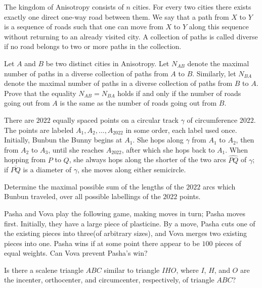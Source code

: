 \documentclass[11pt]{scrartcl}
\begin{document}
\begin{problem}[9103148252094553273]
	The kingdom of Anisotropy consists of $n$ cities. For every two cities there exists exactly one direct one-way road between them. We say that a path from $X$ to $Y$ is a sequence of roads such that one can move from $X$ to $Y$ along this sequence without returning to an already visited city. A collection of paths is called diverse if no road belongs to two or more paths in the collection.

Let $A$ and $B$ be two distinct cities in Anisotropy. Let $N_{AB}$ denote the maximal number of paths in a diverse collection of paths from $A$ to $B$. Similarly, let $N_{BA}$ denote the maximal number of paths in a diverse collection of paths from $B$ to $A$. Prove that the equality $N_{AB} = N_{BA}$ holds if and only if the number of roads going out from $A$ is the same as the number of roads going out from $B$.
\end{problem}
\begin{problem}[2974998787723554962]
	There are $2022$ equally spaced points on a circular track $\gamma$ of circumference $2022$. The points are labeled $A_1, A_2, \ldots, A_{2022}$ in some order, each label used once. Initially, Bunbun the Bunny begins at $A_1$. She hops along $\gamma$ from $A_1$ to $A_2$, then from $A_2$ to $A_3$, until she reaches $A_{2022}$, after which she hops back to $A_1$. When hopping from $P$ to $Q$, she always hops along the shorter of the two arcs $\widehat{PQ}$ of $\gamma$; if $\overline{PQ}$ is a diameter of $\gamma$, she moves along either semicircle.

Determine the maximal possible sum of the lengths of the $2022$ arcs which Bunbun traveled, over all possible labellings of the $2022$ points.
\end{problem}
\begin{problem}[829271701496996]
Pasha and Vova play the following game, making moves in turn; Pasha moves first. Initially, they have a large piece of plasticine. By a move, Pasha cuts one of the existing pieces into three(of arbitrary sizes), and Vova merges two existing pieces into one. Pasha wins if at some point there appear to be $100$ pieces of equal weights. Can Vova prevent Pasha's win?
\end{problem}
\begin{problem}[2672133756769464425]
Is there a scalene triangle $ABC$ similar to triangle $IHO$, where $I$, $H$, and $O$ are the incenter, orthocenter, and circumcenter, respectively, of triangle $ABC$?
\end{problem}
\end{document}
